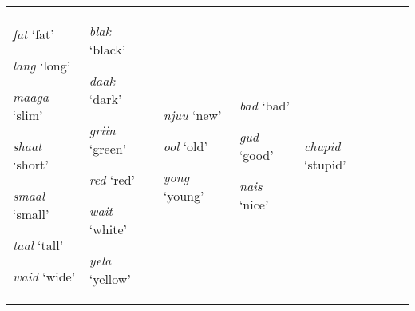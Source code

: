 \begin{sidewaystable}
\begin{tabular}{p{2.7cm}p{2cm}p{2cm}p{1.7cm}p{1.7cm}p{2.7cm}p{2cm}}
                                      \textit{fat} `fat'

                                      \textit{lang} `long'

                                      \textit{maaga} `slim'

                                      \textit{shaat} `short'

                                      \textit{smaal} `small'

                                      \textit{taal} `tall'

                                      \textit{waid} `wide'

                                                            &
 
                                                              \textit{blak} `black’

                                                              \textit{daak} `dark’

                                                              \textit{griin} `green’

                                                              \textit{red} `red'

                                                              \textit{wait} `white'

                                                              \textit{yela} `yellow' 
                                                                                & 

                                                                                  \textit{njuu} `new'

                                                                                  \textit{ool} `old'

                                                                                  \textit{yong} `young'

                                                                                                  &
                                                                                                    \textit{bad} `bad'

                                                                                                    \textit{gud} `good'

                                                                                                    \textit{nais} `nice'
                                                                                                                      &
                                                                                                                        \textit{chupid} `stupid'


\end{tabular}
\end{sidewaystable}
